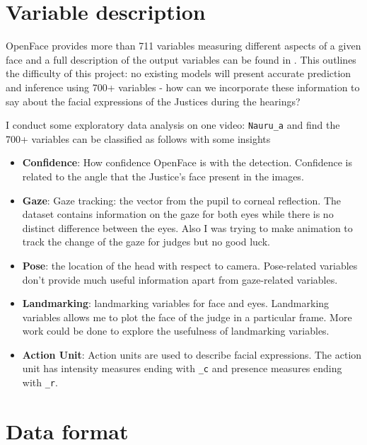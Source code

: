 \documentclass{monashthesis}
\begin{document}
\hypertarget{variable-description}{%
\section{Variable description}\label{variable-description}}

OpenFace provides more than 711 variables measuring different aspects of a given face and a full description of the output variables can be found in \textcite{baltrusaitis2018openface}. This outlines the difficulty of this project: no existing models will present accurate prediction and inference using 700+ variables - how can we incorporate these information to say about the facial expressions of the Justices during the hearings?

I conduct some exploratory data analysis on one video: \texttt{Nauru\_a} and find the 700+ variables can be classified as follows with some insights

\begin{itemize}
\item
  \textbf{Confidence}: How confidence OpenFace is with the detection. Confidence is related to the angle that the Justice's face present in the images.
\item
  \textbf{Gaze}: Gaze tracking: the vector from the pupil to corneal reflection. The dataset contains information on the gaze for both eyes while there is no distinct difference between the eyes. Also I was trying to make animation to track the change of the gaze for judges but no good luck.
\item
  \textbf{Pose}: the location of the head with respect to camera. Pose-related variables don't provide much useful information apart from gaze-related variables.
\item
  \textbf{Landmarking}: landmarking variables for face and eyes. Landmarking variables allows me to plot the face of the judge in a particular frame. More work could be done to explore the usefulness of landmarking variables.
\item
  \textbf{Action Unit}: Action units are used to describe facial expressions. The action unit has intensity measures ending with \texttt{\_c} and presence measures ending with \texttt{\_r}.
\end{itemize}

\hypertarget{data-format}{%
\section{Data format}\label{data-format}}
\end{document}
